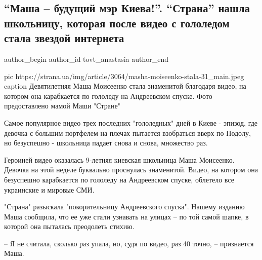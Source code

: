  
 
 
 
 
 
\subsection{\enquote{Маша – будущий мэр Киева!}. \enquote{Страна} нашла школьницу, которая после видео с гололедом стала звездой интернета}
\label{sec:13_12_2020.news.ua.strana.tovt_anastasia.1.masha_buduscii_mer_kieva}
\ifcmt
	author_begin
   author_id tovt_anastasia
	author_end
\fi


\ifcmt
pic https://strana.ua/img/article/3064/masha-moiseenko-stala-31_main.jpeg
caption Девятилетняя Маша Моисеенко стала знаменитой благодаря видео, на котором она карабкается по гололеду на Андреевском спуске. Фото предоставлено мамой Маши "Стране" 
\fi

Самое популярное видео трех последних "гололедных" дней в Киеве - эпизод, где
девочка с большим портфелем на плечах пытается взобраться вверх по Подолу, но
безуспешно - школьница падает снова и снова, множество раз.

Героиней видео оказалась 9-летняя киевская школьница Маша Моисеенко. Девочка на
этой неделе буквально проснулась знаменитой. Видео, на котором она безуспешно
карабкается по гололеду на Андреевском спуске, облетело все украинские и
мировые СМИ.
 
"Страна" разыскала "покорительницу Андреевского спуска". Нашему изданию Маша
сообщила, что ее уже стали узнавать на улицах – по той самой шапке, в которой
она пыталась преодолеть стихию.
 
– Я не считала, сколько раз упала, но, судя по видео, раз 40 точно, –
признается Маша.


